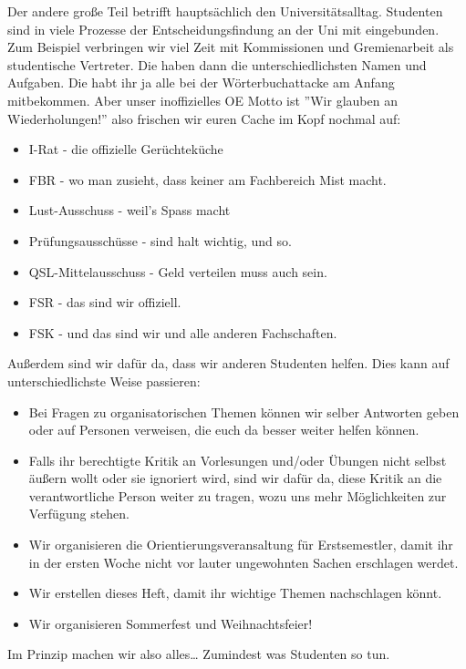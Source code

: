     Der andere große Teil betrifft hauptsächlich den Universitätsalltag.
    Studenten sind in viele Prozesse der Entscheidungsfindung an der Uni
    mit eingebunden.
    Zum Beispiel verbringen wir viel Zeit mit Kommissionen und Gremienarbeit als studentische Vertreter.
    Die haben dann die unterschiedlichsten Namen und Aufgaben.
    Die habt ihr ja alle bei der W\"orterbuchattacke am Anfang mitbekommen.
    Aber unser inoffizielles OE Motto ist ''Wir glauben an Wiederholungen!'' also frischen wir euren Cache im Kopf nochmal auf:
    \begin{itemize}
        \item I-Rat - die offizielle Ger\"uchtek\"uche
        \item FBR - wo man zusieht, dass keiner am Fachbereich Mist macht.
        \item Lust-Ausschuss - weil's Spass macht
        \item Prüfungsausschüsse - sind halt wichtig, und so.
        \item QSL-Mittelausschuss - Geld verteilen muss auch sein.
        \item FSR - das sind wir offiziell.
        \item FSK - und das sind wir und alle anderen Fachschaften.
    \end{itemize}
    Au{\ss}erdem sind wir daf\"ur da, dass wir anderen Studenten helfen. Dies kann auf unterschiedlichste Weise passieren:
    \begin{itemize}
        \item Bei Fragen zu organisatorischen Themen können wir selber Antworten geben oder auf Personen verweisen, die euch da besser weiter helfen können.
        \item Falls ihr berechtigte Kritik an Vorlesungen und/oder Übungen nicht selbst äußern wollt oder sie ignoriert wird, sind wir dafür da, diese Kritik an die verantwortliche Person weiter zu tragen, wozu uns mehr Möglichkeiten zur Verfügung stehen.
        \item Wir organisieren die Orientierungsveransaltung für Erstsemestler, damit ihr in der ersten Woche nicht vor lauter ungewohnten Sachen erschlagen werdet.
        \item Wir erstellen dieses Heft, damit ihr wichtige Themen nachschlagen könnt.
        \item Wir organisieren Sommerfest und Weihnachtsfeier!
    \end{itemize}
    Im Prinzip machen wir also alles\dots\hspace{1cm} Zumindest was Studenten so tun.
    


